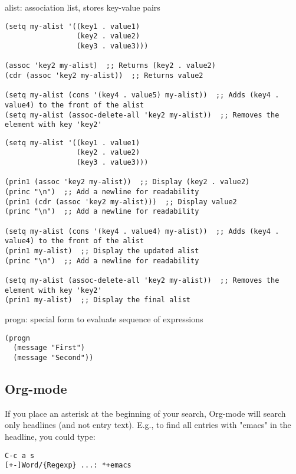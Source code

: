\documentclass{article}
\begin{document}
alist: association list, stores key-value pairs\\[0pt]
\begin{verbatim}
(setq my-alist '((key1 . value1)
                 (key2 . value2)
                 (key3 . value3)))

(assoc 'key2 my-alist)  ;; Returns (key2 . value2)
(cdr (assoc 'key2 my-alist))  ;; Returns value2

(setq my-alist (cons '(key4 . value5) my-alist))  ;; Adds (key4 . value4) to the front of the alist
(setq my-alist (assoc-delete-all 'key2 my-alist))  ;; Removes the element with key 'key2'

\end{verbatim}

\begin{verbatim}
(setq my-alist '((key1 . value1)
                 (key2 . value2)
                 (key3 . value3)))

(prin1 (assoc 'key2 my-alist))  ;; Display (key2 . value2)
(princ "\n")  ;; Add a newline for readability
(prin1 (cdr (assoc 'key2 my-alist)))  ;; Display value2
(princ "\n")  ;; Add a newline for readability

(setq my-alist (cons '(key4 . value4) my-alist))  ;; Adds (key4 . value4) to the front of the alist
(prin1 my-alist)  ;; Display the updated alist
(princ "\n")  ;; Add a newline for readability

(setq my-alist (assoc-delete-all 'key2 my-alist))  ;; Removes the element with key 'key2'
(prin1 my-alist)  ;; Display the final alist
\end{verbatim}




progn: special form to evaluate sequence of expressions\\[0pt]
\begin{verbatim}
(progn
  (message "First")
  (message "Second"))

\end{verbatim}
\subsection{Org-mode}
\label{sec:org341ab58}

If you place an asterisk at the beginning of your search, Org-mode will search only headlines (and not entry text). E.g., to find all entries with "emacs" in the headline, you could type:\\[0pt]

\begin{verbatim}
C-c a s
[+-]Word/{Regexp} ...: *+emacs

\end{verbatim}
\end{document}

